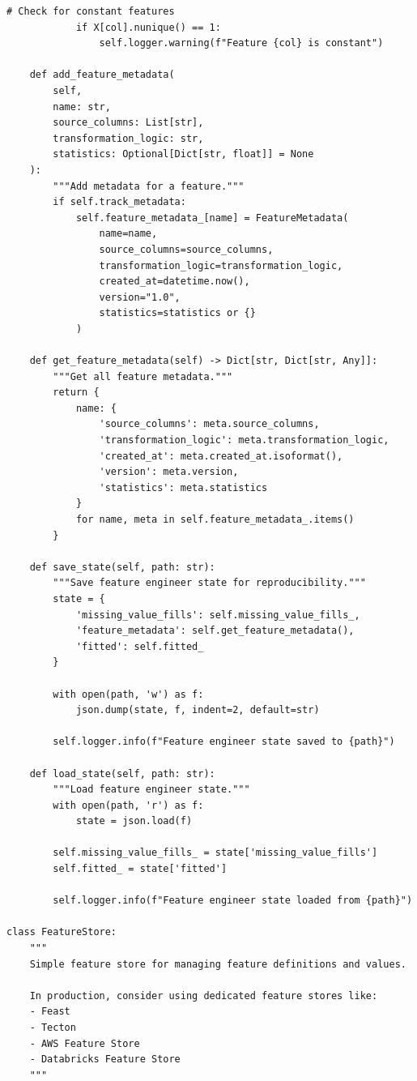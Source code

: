 \begin{lstlisting}[style=python, caption={Production Feature Engineering Framework}]
            # Check for constant features
            if X[col].nunique() == 1:
                self.logger.warning(f"Feature {col} is constant")

    def add_feature_metadata(
        self,
        name: str,
        source_columns: List[str],
        transformation_logic: str,
        statistics: Optional[Dict[str, float]] = None
    ):
        """Add metadata for a feature."""
        if self.track_metadata:
            self.feature_metadata_[name] = FeatureMetadata(
                name=name,
                source_columns=source_columns,
                transformation_logic=transformation_logic,
                created_at=datetime.now(),
                version="1.0",
                statistics=statistics or {}
            )

    def get_feature_metadata(self) -> Dict[str, Dict[str, Any]]:
        """Get all feature metadata."""
        return {
            name: {
                'source_columns': meta.source_columns,
                'transformation_logic': meta.transformation_logic,
                'created_at': meta.created_at.isoformat(),
                'version': meta.version,
                'statistics': meta.statistics
            }
            for name, meta in self.feature_metadata_.items()
        }

    def save_state(self, path: str):
        """Save feature engineer state for reproducibility."""
        state = {
            'missing_value_fills': self.missing_value_fills_,
            'feature_metadata': self.get_feature_metadata(),
            'fitted': self.fitted_
        }

        with open(path, 'w') as f:
            json.dump(state, f, indent=2, default=str)

        self.logger.info(f"Feature engineer state saved to {path}")

    def load_state(self, path: str):
        """Load feature engineer state."""
        with open(path, 'r') as f:
            state = json.load(f)

        self.missing_value_fills_ = state['missing_value_fills']
        self.fitted_ = state['fitted']

        self.logger.info(f"Feature engineer state loaded from {path}")

class FeatureStore:
    """
    Simple feature store for managing feature definitions and values.

    In production, consider using dedicated feature stores like:
    - Feast
    - Tecton
    - AWS Feature Store
    - Databricks Feature Store
    """


\end{lstlisting}

